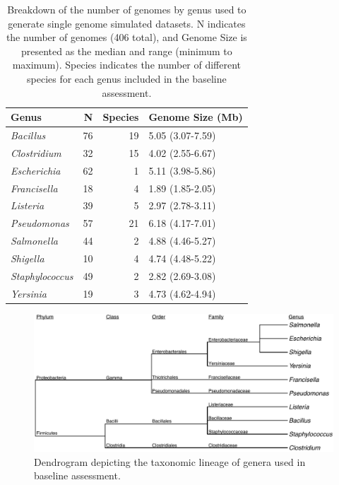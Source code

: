 \documentclass[fleqn,10pt,lineno]{wlpeerj}\usepackage[]{graphicx}\usepackage[]{color}
\makeatletter
\def\maxwidth{ %
  \ifdim\Gin@nat@width>\linewidth
    \linewidth
  \else
    \Gin@nat@width
  \fi
}
\newenvironment{knitrout}{}{} %
\makeatother
\begin{document}
\begin{table}[ht]
\centering
\begin{tabular}{lrrl}
  \hline
Genus & N & Species & Genome Size (Mb) \\ 
  \hline
\textit{Bacillus} &  76 &  19 & 5.05 (3.07-7.59) \\ 
  \textit{Clostridium} &  32 &  15 & 4.02 (2.55-6.67) \\ 
  \textit{Escherichia} &  62 &   1 & 5.11 (3.98-5.86) \\ 
  \textit{Francisella} &  18 &   4 & 1.89 (1.85-2.05) \\ 
  \textit{Listeria} &  39 &   5 & 2.97 (2.78-3.11) \\ 
  \textit{Pseudomonas} &  57 &  21 & 6.18 (4.17-7.01) \\ 
  \textit{Salmonella} &  44 &   2 & 4.88 (4.46-5.27) \\ 
  \textit{Shigella} &  10 &   4 & 4.74 (4.48-5.22) \\ 
  \textit{Staphylococcus} &  49 &   2 & 2.82 (2.69-3.08) \\ 
  \textit{Yersinia} &  19 &   3 & 4.73 (4.62-4.94) \\ 
   \hline
\end{tabular}
\caption{Breakdown of the number of genomes by genus used to generate single genome simulated datasets. N indicates the number of genomes (406 total), and Genome Size is presented as the median and range (minimum to maximum). Species indicates the number of different species for each genus included in the baseline assessment.} 
\label{tab:single_org}
\end{table}


\begin{knitrout}
\color{fgcolor}\begin{figure}
\includegraphics[width=\maxwidth]{figure/genus_tree} \caption[Dendrogram depicting the taxonomic lineage of genera used in baseline assessment]{Dendrogram depicting the taxonomic lineage of genera used in baseline assessment.}\label{fig:single_org_tree}
\end{figure}


\end{knitrout}
\end{document}
